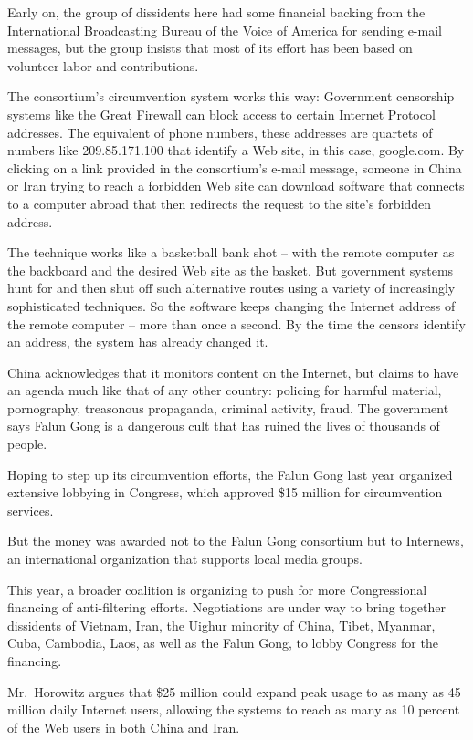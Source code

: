 \documentclass[12pt,a4paper,onecolumn]{article}
\begin{document}
Early on, the group of dissidents here had some financial backing from the International
Broadcasting Bureau of the Voice of America for sending e-mail messages, but the group insists that
most of its effort has been based on volunteer labor and contributions.

The consortium's circumvention system works this way: Government censorship systems like the Great
Firewall can block access to certain Internet Protocol addresses. The equivalent of phone numbers,
these addresses are quartets of numbers like 209.85.171.100 that identify a Web site, in this case,
google.com. By clicking on a link provided in the consortium's e-mail message, someone in China or
Iran trying to reach a forbidden Web site can download software that connects to a computer abroad
that then redirects the request to the site's forbidden address.

The technique works like a basketball bank shot -- with the remote computer as the backboard and the
desired Web site as the basket. But government systems hunt for and then shut off such alternative
routes using a variety of increasingly sophisticated techniques. So the software keeps changing the
Internet address of the remote computer -- more than once a second. By the time the censors identify
an address, the system has already changed it.

China acknowledges that it monitors content on the Internet, but claims to have an agenda much like
that of any other country: policing for harmful material, pornography, treasonous propaganda,
criminal activity, fraud. The government says Falun Gong is a dangerous cult that has ruined the
lives of thousands of people.

Hoping to step up its circumvention efforts, the Falun Gong last year organized extensive lobbying
in Congress, which approved \$15 million for circumvention services.

But the money was awarded not to the Falun Gong consortium but to Internews, an international
organization that supports local media groups.

This year, a broader coalition is organizing to push for more Congressional financing of
anti-filtering efforts. Negotiations are under way to bring together dissidents of Vietnam, Iran,
the Uighur minority of China, Tibet, Myanmar, Cuba, Cambodia, Laos, as well as the Falun Gong, to
lobby Congress for the financing.

Mr.~Horowitz argues that \$25 million could expand peak usage to as many as 45 million daily
Internet users, allowing the systems to reach as many as 10 percent of the Web users in both China
and Iran.
\end{document}
